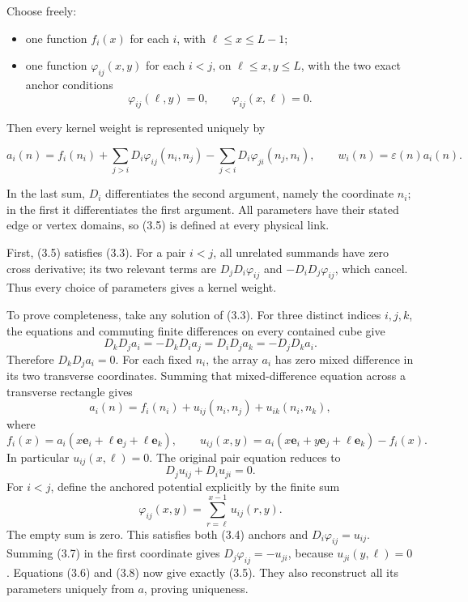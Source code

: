 \documentclass[
  11pt,
]{article}
\providecommand{\tightlist}{%
  \setlength{\itemsep}{0pt}\setlength{\parskip}{0pt}}
\begin{document}
Choose freely:

\begin{itemize}
\tightlist
\item
  one function \(f_i(x)\) for each \(i\), with \(\ell\le x\le L-1\);
\item
  one function \(\varphi_{ij}(x,y)\) for each \(i<j\), on
  \(\ell\le x,y\le L\), with the two exact anchor conditions \[
  \varphi_{ij}(\ell,y)=0,\qquad \varphi_{ij}(x,\ell)=0.
  \tag{3.4}
  \]
\end{itemize}

Then every kernel weight is represented uniquely by

\[
\boxed{
a_i(n)=f_i(n_i)
+\sum_{j>i}D_i\varphi_{ij}(n_i,n_j)
-\sum_{j<i}D_i\varphi_{ji}(n_j,n_i),\qquad
w_i(n)=\varepsilon(n)a_i(n).}
\tag{3.5}
\]

In the last sum, \(D_i\) differentiates the second argument, namely the
coordinate \(n_i\); in the first it differentiates the first argument.
All parameters have their stated edge or vertex domains, so (3.5) is
defined at every physical link.

First, (3.5) satisfies (3.3). For a pair \(i<j\), all unrelated summands
have zero cross derivative; its two relevant terms are
\(D_jD_i\varphi_{ij}\) and \(-D_iD_j\varphi_{ij}\), which cancel. Thus
every choice of parameters gives a kernel weight.

To prove completeness, take any solution of (3.3). For three distinct
indices \(i,j,k\), the equations and commuting finite differences on
every contained cube give \[
D_kD_ja_i=-D_kD_ia_j
=D_iD_ja_k=-D_jD_ka_i.
\] Therefore \(D_kD_ja_i=0\). For each fixed \(n_i\), the array \(a_i\)
has zero mixed difference in its two transverse coordinates. Summing
that mixed-difference equation across a transverse rectangle gives \[
a_i(n)=f_i(n_i)+u_{ij}(n_i,n_j)+u_{ik}(n_i,n_k),
\tag{3.6}
\] where \[
f_i(x)=a_i(x\mathbf e_i+\ell\mathbf e_j+\ell\mathbf e_k),\qquad
u_{ij}(x,y)=a_i(x\mathbf e_i+y\mathbf e_j+\ell\mathbf e_k)-f_i(x).
\] In particular \(u_{ij}(x,\ell)=0\). The original pair equation
reduces to \[
D_ju_{ij}+D_iu_{ji}=0.
\tag{3.7}
\] For \(i<j\), define the anchored potential explicitly by the finite
sum \[
\varphi_{ij}(x,y)=\sum_{r=\ell}^{x-1}u_{ij}(r,y).
\tag{3.8}
\] The empty sum is zero. This satisfies both (3.4) anchors and
\(D_i\varphi_{ij}=u_{ij}\). Summing (3.7) in the first coordinate gives
\(D_j\varphi_{ij}=-u_{ji}\), because \(u_{ji}(y,\ell)=0\). Equations
(3.6) and (3.8) now give exactly (3.5). They also reconstruct all its
parameters uniquely from \(a\), proving uniqueness.
\end{document}
